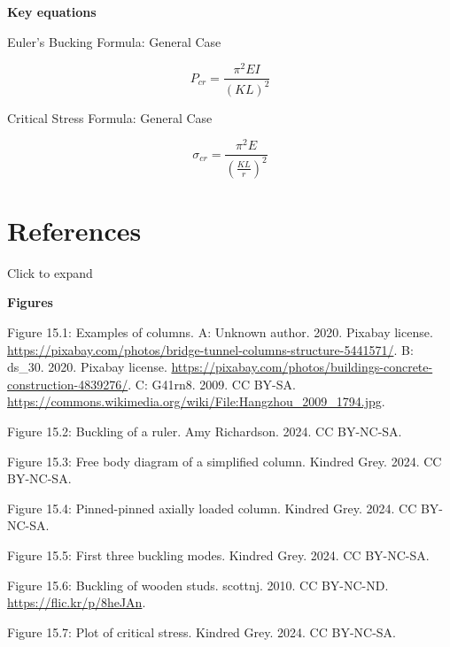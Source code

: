 \documentclass[
  letterpaper,
  DIV=11,
  numbers=noendperiod]{scrreprt}
\theoremstyle{definition}
\theoremstyle{remark}
\begin{document}
\begin{tcolorbox}[enhanced jigsaw, leftrule=.75mm, bottomrule=.15mm, opacityback=0, opacitybacktitle=0.6, colframe=quarto-callout-note-color-frame, toprule=.15mm, colbacktitle=quarto-callout-note-color!10!white, coltitle=black, bottomtitle=1mm, title={Note}, titlerule=0mm, toptitle=1mm, colback=white, rightrule=.15mm, left=2mm, arc=.35mm, breakable]

\textbf{Key equations}

Euler's Bucking Formula: General Case

\[
P_{c r}=\frac{\pi^2 E I}{(K L)^2}
\]

Critical Stress Formula: General Case

\[
\sigma_{c r}=\frac{\pi^2 E}{\left(\frac{K L}{r}\right)^2}
\]

\end{tcolorbox}

\section*{References}\label{references-14}


Click to expand

\textbf{Figures}

Figure 15.1: Examples of columns. A: Unknown author. 2020. Pixabay
license.
\url{https://pixabay.com/photos/bridge-tunnel-columns-structure-5441571/}.
B: ds\_30. 2020. Pixabay license.
\url{https://pixabay.com/photos/buildings-concrete-construction-4839276/}.
C: G41rn8. 2009. CC BY-SA.
\href{https://commons.wikimedia.org/wiki/File:Hangzhou_2009_1794.jpg.}{https://commons.wikimedia.org/wiki/File:Hangzhou\_2009\_1794.jpg}.

Figure 15.2: Buckling of a ruler. Amy Richardson. 2024. CC BY-NC-SA.

Figure 15.3: Free body diagram of a simplified column. Kindred Grey.
2024. CC BY-NC-SA.

Figure 15.4: Pinned-pinned axially loaded column. Kindred Grey. 2024. CC
BY-NC-SA.

Figure 15.5: First three buckling modes. Kindred Grey. 2024. CC
BY-NC-SA.

Figure 15.6: Buckling of wooden studs. scottnj. 2010. CC BY-NC-ND.
\url{https://flic.kr/p/8heJAn}.

Figure 15.7: Plot of critical stress. Kindred Grey. 2024. CC BY-NC-SA.
\end{document}
